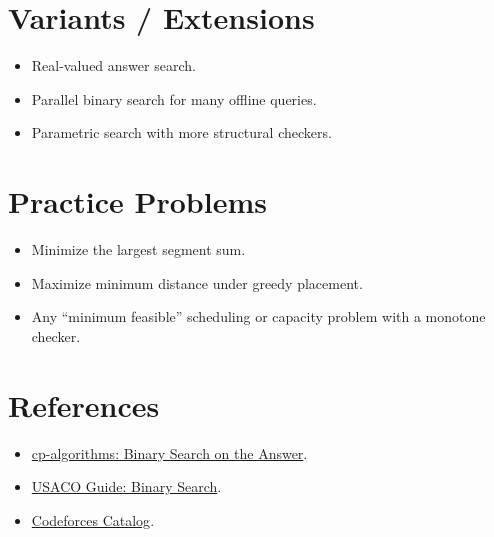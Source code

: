 \section*{Variants / Extensions}

\begin{itemize}
  \item Real-valued answer search.
  \item Parallel binary search for many offline queries.
  \item Parametric search with more structural checkers.
\end{itemize}

\section*{Practice Problems}

\begin{itemize}
  \item Minimize the largest segment sum.
  \item Maximize minimum distance under greedy placement.
  \item Any ``minimum feasible'' scheduling or capacity problem with a monotone checker.
\end{itemize}

\section*{References}

\begin{itemize}
  \item \href{https://cp-algorithms.com/num_methods/binary_search.html}{cp-algorithms: Binary Search on the Answer}.
  \item \href{https://usaco.guide/silver/binary-search}{USACO Guide: Binary Search}.
  \item \href{https://codeforces.com/catalog}{Codeforces Catalog}.
\end{itemize}
